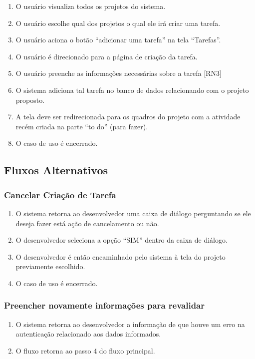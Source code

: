 \begin{enumerate}
  \item O usuário visualiza todos os projetos do sistema.
  \item O usuário escolhe qual dos projetos o qual ele irá criar uma tarefa.
  \item O usuário aciona o botão “adicionar uma tarefa” na tela “Tarefas”.
  \item O usuário é direcionado para a página de criação da tarefa.
  \item O usuário preenche as informações necessárias sobre a tarefa [RN3]
  \item O sistema adiciona tal tarefa no banco de dados relacionando com o projeto proposto.
  \item A tela deve ser redirecionada para os quadros do projeto com a atividade recém criada na parte ``to do'' (para fazer).
  \item O caso de uso é encerrado.
\end{enumerate}

\subsection{Fluxos Alternativos}

\subsubsection{Cancelar Criação de Tarefa}

\begin{enumerate}
  \item O sistema retorna ao desenvolvedor uma caixa de diálogo perguntando se ele deseja fazer está ação de cancelamento ou não.
  \item O desenvolvedor seleciona a opção “SIM” dentro da caixa de diálogo.
  \item O desenvolvedor é então encaminhado pelo sistema à tela do projeto previamente escolhido.
  \item O caso de uso é encerrado.
\end{enumerate}

\subsubsection{Preencher novamente informações para revalidar}

\begin{enumerate}
  \item O sistema retorna ao desenvolvedor a informação de que houve um erro na autenticação relacionado aos dados informados.
  \item O fluxo retorna ao passo 4 do fluxo principal.
\end{enumerate}

